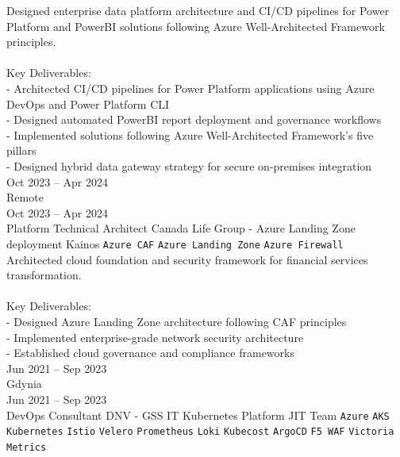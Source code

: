 \documentclass[9pt]{style/developercv}
\begin{document}
\begin{entrylist}
{      Designed enterprise data platform architecture and CI/CD pipelines for Power Platform and PowerBI solutions following Azure Well-Architected Framework principles.\\
      \\
      Key Deliverables:\\
      - Architected CI/CD pipelines for Power Platform applications using Azure DevOps and Power Platform CLI\\
      - Designed automated PowerBI report deployment and governance workflows\\
      - Implemented solutions following Azure Well-Architected Framework's five pillars\\
      - Designed hybrid data gateway strategy for secure on-premises integration\\
    }
    \entry
    {Oct 2023 -- Apr 2024\\\footnotesize{Remote}
    \\Oct 2023  -- Apr 2024\\\footnotesize{Platform Technical Architect}}
        {Canada Life Group - Azure Landing Zone deployment}
        {Kainos}
        {
            \texttt{Azure CAF}\slashsep
      \texttt{Azure Landing Zone}\slashsep
            \texttt{Azure Firewall}\\

      Architected cloud foundation and security framework for financial services transformation.\\
      \\
      Key Deliverables:\\
      - Designed Azure Landing Zone architecture following CAF principles\\
      - Implemented enterprise-grade network security architecture\\
      - Established cloud governance and compliance frameworks\\
        }
    \entry
    {Jun 2021 -- Sep 2023\\\footnotesize{Gdynia}
    \\Jun 2021 -- Sep 2023\\\footnotesize{DevOps Consultant}}
        {DNV - GSS IT Kubernetes Platform}
        {JIT Team}
        {
            \texttt{Azure}\slashsep
      \texttt{AKS}\slashsep
            \texttt{Kubernetes}\slashsep
            \texttt{Istio}\slashsep
            \texttt{Velero}\slashsep
      \texttt{Prometheus}\slashsep
      \texttt{Loki}\slashsep
      \texttt{Kubecost}\slashsep
      \texttt{ArgoCD}\slashsep
      \texttt{F5 WAF}\slashsep
      \texttt{Victoria Metrics}\\

}
\end{entrylist}
\end{document}
